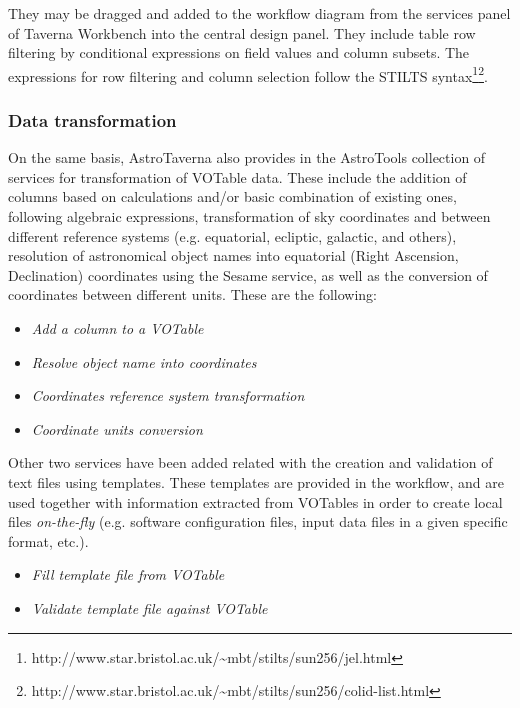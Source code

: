 \documentclass{aa}
\begin{document}
They may be dragged and added to the workflow diagram from the services panel of Taverna Workbench into the central design panel. They include table row filtering by conditional expressions on field values and column subsets. The expressions for row filtering and column selection follow the STILTS syntax\footnote{http://www.star.bristol.ac.uk/\~{}mbt/stilts/sun256/jel.html}\fnmsep\footnote{http://www.star.bristol.ac.uk/\~{}mbt/stilts/sun256/colid-list.html}.

\subsubsection{Data transformation}
\label{DataTransformation}

On the same basis, AstroTaverna also provides in the AstroTools collection of services for transformation of VOTable data. These include the addition of columns based on calculations and/or basic combination of existing ones, following algebraic expressions, transformation of sky coordinates and between different reference systems (e.g. equatorial, ecliptic, galactic, and others), resolution of astronomical object names into equatorial (Right Ascension, Declination) coordinates using the Sesame service, as well as the conversion of coordinates between different units. These are the following:

\begin{itemize}
\item \textit{Add a column to a VOTable}
\item \textit{Resolve object name into coordinates} 
\item \textit{Coordinates reference system transformation}
\item \textit{Coordinate units conversion}
\end{itemize}

Other two services have been added related with the creation and validation of text files using templates. These templates are provided in the workflow, and are used together with information extracted from VOTables in order to create local files \textit{on-the-fly} (e.g. software configuration files, input data files in a given specific format, etc.).

\begin{itemize}
\item \textit{Fill template file from VOTable}
\item \textit{Validate template file against VOTable}
\end{itemize}
\end{document}
